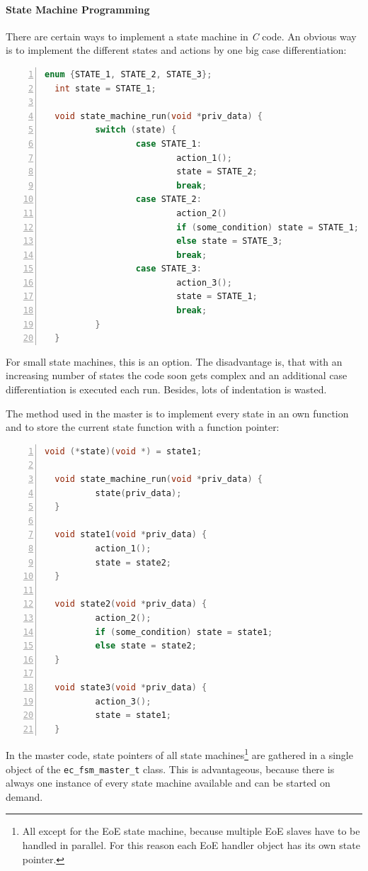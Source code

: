 \documentclass[a4paper,12pt,BCOR6mm,bibtotoc,idxtotoc]{scrbook}
\begin{document}
\paragraph{State Machine Programming}

There are certain ways to implement a state machine in \textit{C}
code. An obvious way is to implement the different states and actions
by one big case differentiation:

\begin{lstlisting}[gobble=2,language=C,numbers=left]
  enum {STATE_1, STATE_2, STATE_3};
  int state = STATE_1;

  void state_machine_run(void *priv_data) {
          switch (state) {
                  case STATE_1:
                          action_1();
                          state = STATE_2;
                          break;
                  case STATE_2:
                          action_2()
                          if (some_condition) state = STATE_1;
                          else state = STATE_3;
                          break;
                  case STATE_3:
                          action_3();
                          state = STATE_1;
                          break;
          }
  }
\end{lstlisting}

For small state machines, this is an option. The disadvantage is, that
with an increasing number of states the code soon gets complex and an
additional case differentiation is executed each run. Besides, lots of
indentation is wasted.

The method used in the master is to implement every state in an own
function and to store the current state function with a function
pointer:

\begin{lstlisting}[gobble=2,language=C,numbers=left]
  void (*state)(void *) = state1;

  void state_machine_run(void *priv_data) {
          state(priv_data);
  }

  void state1(void *priv_data) {
          action_1();
          state = state2;
  }

  void state2(void *priv_data) {
          action_2();
          if (some_condition) state = state1;
          else state = state2;
  }

  void state3(void *priv_data) {
          action_3();
          state = state1;
  }
\end{lstlisting}

In the master code, state pointers of all state machines\footnote{All except
for the EoE state machine, because multiple EoE slaves have to be handled in
parallel. For this reason each EoE handler object has its own state pointer.}
are gathered in a single object of the \lstinline+ec_fsm_master_t+ class. This
is advantageous, because there is always one instance of every state machine
available and can be started on demand.
\end{document}
